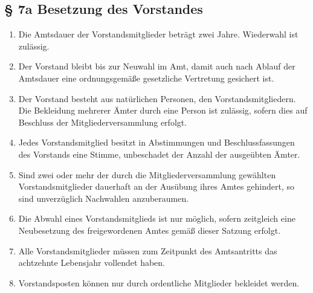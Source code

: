\documentclass[11pt,a4paper]{scrartcl}
\begin{document}
\subsection*{§ 7a Besetzung des Vorstandes}
\begin{enumerate}[label=\arabic*.]
    \item Die Amtsdauer der Vorstandsmitglieder beträgt zwei Jahre. Wiederwahl ist zulässig. 
    \item Der Vorstand bleibt bis zur Neuwahl im Amt, damit auch nach Ablauf der Amtsdauer eine ordnungsgemäße gesetzliche Vertretung gesichert ist.
    \item Der Vorstand besteht aus natürlichen Personen, den Vorstandsmitgliedern. Die Bekleidung mehrerer Ämter durch eine Person ist zulässig, sofern dies auf Beschluss der Mitgliederversammlung erfolgt.
    \item Jedes Vorstandsmitglied besitzt in Abstimmungen und Beschlussfassungen des Vorstands eine Stimme, unbeschadet der Anzahl der ausgeübten Ämter.
    \item Sind zwei oder mehr der durch die Mitgliederversammlung gewählten Vorstandsmitglieder dauerhaft an der Ausübung ihres Amtes gehindert, so sind unverzüglich Nachwahlen anzuberaumen.
    \item Die Abwahl eines Vorstandsmitglieds ist nur möglich, sofern zeitgleich eine Neubesetzung des freigewordenen Amtes gemäß dieser Satzung erfolgt.
    \item Alle Vorstandsmitglieder müssen zum Zeitpunkt des Amtsantritts das achtzehnte Lebensjahr vollendet haben.
    \item Vorstandsposten können nur durch ordentliche Mitglieder bekleidet werden.
\end{enumerate}
\end{document}
